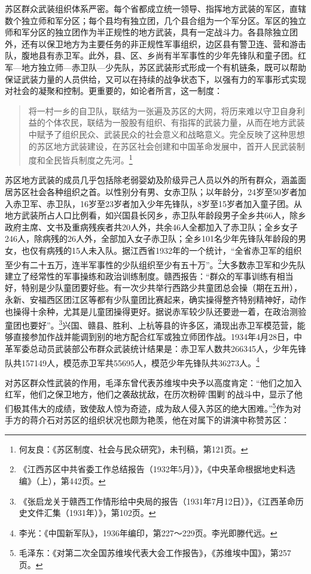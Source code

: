 苏区群众武装组织体系严密。每个省都成立统一领导、指挥地方武装的军区，直辖数个独立师和军分区；每个县均有独立团，几个县合组为一个军分区。军区的独立师和军分区的独立团作为半正规性的地方武装，具有一定战斗力。各县除独立团外，还有以保卫地方为主要任务的非正规性军事组织，边区县有警卫连、营和游击队，腹地县有赤卫军。此外，县、区、乡尚有半军事性的少年先锋队和童子团。红军—地方独立师—赤卫队—少先队，苏区武装形式形成一个有机链条，既可以帮助保证武装力量的人员供给，又可以在持续的战争状态下，以强有力的军事形式实现对社会的凝聚和控制。更重要的，如论者所言，这一制度：

\begin{quote}

将一村一乡的自卫队，联结为一张遍及苏区的大网，将历来难以守卫自身利益的个体农民，联结为一股股有组织、有指挥的武装力量，从而在地方武装中赋予了组织民众、武装民众的社会意义和战略意义。完全反映了这种思想的苏区地方武装建设，在苏区社会创建和中国革命发展中，首开人民武装制度和全民皆兵制度之先河。\footnote{何友良：《苏区制度、社会与民众研究》，未刊稿，第121页。}
\end{quote}


苏区地方武装的成员几乎包括除老弱婴幼及阶级异己人员以外的所有群众，涵盖面居苏区社会各种组织之首。以性别分有男、女赤卫队；以年龄分，24岁至50岁者加入赤卫军、赤卫队，16岁至23岁者加入少年先锋队，8岁至15岁者加入童子团。从地方武装所占人口比例看，如兴国县长冈乡，赤卫队年龄段男子全乡共66人，除乡政府主席、文书及重病残疾者共20人外，共余46人全都加入了赤卫队；全乡女子246人，除病残的26人外，全部加入女子赤卫队；全乡101名少年先锋队年龄段的男女，也仅有病残的15人未入队。据江西省1932年的一个统计，“全省赤卫军的组织至少有二十五万，连半军事性的少队组织至少有五十万”。\footnote{《江西苏区中共省委工作总结报告（1932年5月）》，《中央革命根据地史料选编》（上），第442页。}大多数赤卫军和少先队建立了经常性的军事操练和政治训练制度。赣西报告：“群众的军事训练有相当好，特别是少队童团要好些。有一次少共举行西路少共童团总会操（期在五卅），永新、安福西区团江区等都有少队童团比赛起来，确实操得整齐特别精神好，动作也操得十余种，尤其是儿童团操得更好。据说赤军较少队还要逊一着，在政治测验童团也要好”。\footnote{《张启龙关于赣西工作情形给中央局的报告（1931年7月12日）》，《江西革命历史文件汇集（1931年）》，第102页。}兴国、赣县、胜利、上杭等县的许多区，涌现出赤卫军模范营，能够直接参加作战并能调到别的地方配合红军或独立师团作战。1934年4月28日，中革军委总动员武装部公布群众武装统计结果是：赤卫军人数共266345人，少年先锋队共157149人，模范赤卫军共55695人，模范少年先锋队共36273人。\footnote{李光：《中国新军队》，1936年编印，第227～229页。李光即滕代远。}


对苏区群众性武装的作用，毛泽东曾代表苏维埃中央予以高度肯定：“他们之加入红军，他们之保卫地方，他们之袭敌扰敌，在历次粉碎‘围剿’的战斗中，显示了他们极其伟大的成绩，致使敌人惊为奇迹，成为敌人侵入苏区的绝大困难。”\footnote{毛泽东：《对第二次全国苏维埃代表大会工作报告》，《苏维埃中国》，第257页。}作为对手方的蒋介石对苏区的组织状况也颇为艳羡，他在对属下的讲演中称赞苏区：

